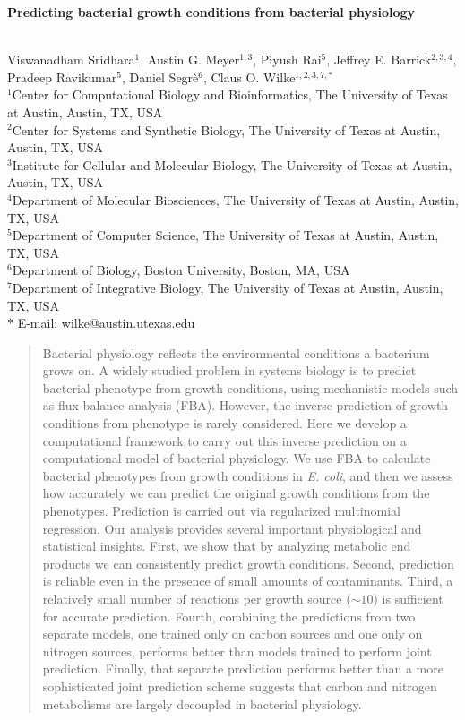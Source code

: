 \documentclass[12pt]{article}
\date{}
\begin{document}
\begin{flushleft}
{\Large
\textbf{Predicting bacterial growth conditions from bacterial physiology}
}

\bigskip
\noindent
\\
Viswanadham Sridhara$^{1}$,
Austin G. Meyer$^{1,3}$,
Piyush Rai$^{5}$,
Jeffrey E. Barrick$^{2,3,4}$,
Pradeep Ravikumar$^{5}$,
Daniel Segr\`e$^{6}$, 
Claus O. Wilke$^{1,2,3,7,\ast}$
\\
\bigskip
$^1$Center for Computational Biology and Bioinformatics, The University of Texas at Austin, Austin, TX, USA
\\
$^2$Center for Systems and Synthetic Biology, The University of Texas at Austin, Austin, TX, USA
\\
$^3$Institute for Cellular and Molecular Biology, The University of Texas at Austin, Austin, TX, USA
\\
$^4$Department of Molecular Biosciences, The University of Texas at Austin, Austin, TX, USA
\\
$^5$Department of Computer Science, The University of Texas at Austin, Austin, TX, USA
\\
$^6$Department of Biology, Boston University, Boston, MA, USA
\\
$^7$Department of Integrative Biology, The University of Texas at Austin, Austin, TX, USA
\\
\bigskip
$\ast$ E-mail: wilke@austin.utexas.edu
\end{flushleft}

\begin{abstract}
Bacterial physiology reflects the environmental conditions a bacterium grows on. A widely studied problem in systems biology is to predict bacterial phenotype from growth conditions, using mechanistic models such as flux-balance analysis (FBA). However, the inverse prediction of growth conditions from phenotype is rarely considered. Here we develop a computational framework to carry out this inverse prediction on a computational model of bacterial physiology. We use FBA to calculate bacterial phenotypes from growth conditions in \emph{E. coli}, and then we assess how accurately we can predict the original growth conditions from the phenotypes. Prediction is carried out via regularized multinomial regression. Our analysis provides several important physiological and statistical insights. First, we show that by analyzing metabolic end products we can consistently predict growth conditions. Second, prediction is reliable even in the presence of small amounts of contaminants. Third, a relatively small number of reactions per growth source ($\mathord{\sim}10$) is sufficient for accurate prediction. Fourth, combining the predictions from two separate models, one trained only on carbon sources and one only on nitrogen sources, performs better than models trained to perform joint prediction. Finally, that separate prediction performs better than a more sophisticated joint prediction scheme suggests that carbon and nitrogen metabolisms are largely decoupled in bacterial physiology.
\end{abstract}
\end{document}
